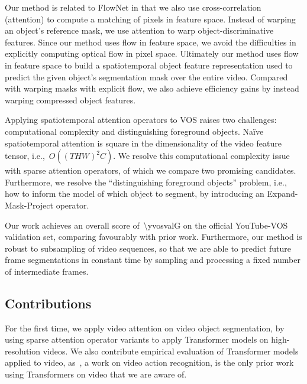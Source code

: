 Our method is related to FlowNet in that we also use cross-correlation
(attention) to compute a matching of pixels in feature space.
Instead of warping an object's reference mask, we use attention to warp
object-discriminative features.
Since our method uses flow in feature space, we avoid the difficulties in
explicitly computing optical flow in pixel space.
Ultimately our method uses flow in feature space to build a spatiotemporal
object feature representation used to predict the given object's segmentation
mask over the entire video.
Compared with warping masks with explicit flow, we also achieve efficiency
gains by instead warping compressed object features.

Applying spatiotemporal attention operators to VOS raises two challenges:
computational complexity and distinguishing foreground objects.
Na\"ive spatiotemporal attention is square in the dimensionality of the video
feature tensor, i.e.,~$O({(THW)}^2 C)$.
We resolve this computational complexity issue with sparse attention operators,
of which we compare two promising candidates.
Furthermore, we resolve the ``distinguishing foreground objects'' problem,
i.e., how to inform the model of which object to segment, by introducing an
Expand-Mask-Project operator.

Our work achieves an overall score of~\num{\yvosvalG} on the official
YouTube-VOS validation set, comparing favourably with prior work.
Furthermore, our method is robust to subsampling of video sequences, so that we
are able to predict future frame segmentations in constant time by sampling and
processing a fixed number of intermediate frames.


\subsection{Contributions}

For the first time, we apply video attention on video object segmentation, by
using sparse attention operator variants to apply Transformer models on
high-resolution videos.
We also contribute empirical evaluation of Transformer models applied to video,
as~\citet{girdhar2019video}, a work on video action recognition,
is the only prior work using Transformers on video that we are aware of.

